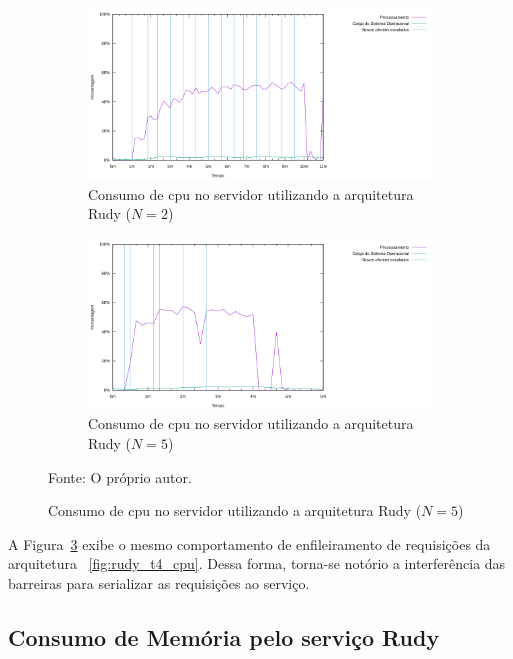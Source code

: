\begin{figure}[htb!]
    \caption{Consumo de \ac{cpu} no servidor utilizando a arquitetura Rudy ($N=2$ e $N=5$)}
    \centering
    \begin{subfigure}{1.0\textwidth}
      \centering
      \includegraphics[width=.9\textwidth]{metricas_rudy_t5/cpu.png}
      \caption{Consumo de \ac{cpu} no servidor utilizando a arquitetura Rudy ($N=2$)}
      \label{fig:rudy_t5_cpu}
    \end{subfigure}


    \begin{subfigure}{1.0\textwidth}
      \centering
      \includegraphics[width=.9\textwidth]{metricas_rudy_t6/cpu.png}
      \caption{Consumo de \ac{cpu} no servidor utilizando a arquitetura Rudy ($N=5$)}
      \label{fig:rudy_t6_cpu}
    \end{subfigure}
    \label{fig:rudy_t56_cpu}

    Fonte: O próprio autor.
\end{figure}
A Figura~\ref{fig:rudy_t56_cpu} exibe o mesmo comportamento de enfileiramento de requisições da arquitetura ~\ref{fig:rudy_t4_cpu}.
%
Dessa forma, torna-se notório a interferência das barreiras para serializar as requisições ao serviço.
%


\subsection{Consumo de Memória pelo serviço Rudy}

